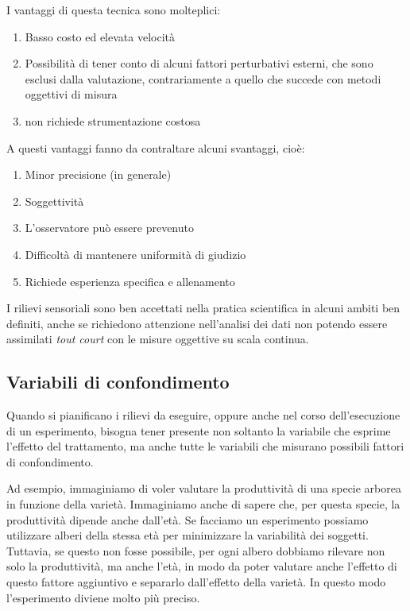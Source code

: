 \documentclass[a4paper,12pt,oneside]{book}
\providecommand{\tightlist}{%
  \setlength{\itemsep}{0pt}\setlength{\parskip}{0pt}}
\theoremstyle{definition}
\theoremstyle{definition}
\theoremstyle{definition}
\theoremstyle{remark}
\begin{document}
I vantaggi di questa tecnica sono molteplici:

\begin{enumerate}
\def\labelenumi{\arabic{enumi}.}
\tightlist
\item
  Basso costo ed elevata velocità
\item
  Possibilità di tener conto di alcuni fattori perturbativi esterni, che
  sono esclusi dalla valutazione, contrariamente a quello che succede
  con metodi oggettivi di misura
\item
  non richiede strumentazione costosa
\end{enumerate}

A questi vantaggi fanno da contraltare alcuni svantaggi, cioè:

\begin{enumerate}
\def\labelenumi{\arabic{enumi}.}
\tightlist
\item
  Minor precisione (in generale)
\item
  Soggettività
\item
  L'osservatore può essere prevenuto
\item
  Difficoltà di mantenere uniformità di giudizio
\item
  Richiede esperienza specifica e allenamento
\end{enumerate}

I rilievi sensoriali sono ben accettati nella pratica scientifica in
alcuni ambiti ben definiti, anche se richiedono attenzione nell'analisi
dei dati non potendo essere assimilati \emph{tout court} con le misure
oggettive su scala continua.

\subsection{Variabili di
confondimento}\label{variabili-di-confondimento}

Quando si pianificano i rilievi da eseguire, oppure anche nel corso
dell'esecuzione di un esperimento, bisogna tener presente non soltanto
la variabile che esprime l'effetto del trattamento, ma anche tutte le
variabili che misurano possibili fattori di confondimento.

Ad esempio, immaginiamo di voler valutare la produttività di una specie
arborea in funzione della varietà. Immaginiamo anche di sapere che, per
questa specie, la produttività dipende anche dall'età. Se facciamo un
esperimento possiamo utilizzare alberi della stessa età per minimizzare
la variabilità dei soggetti. Tuttavia, se questo non fosse possibile,
per ogni albero dobbiamo rilevare non solo la produttività, ma anche
l'età, in modo da poter valutare anche l'effetto di questo fattore
aggiuntivo e separarlo dall'effetto della varietà. In questo modo
l'esperimento diviene molto più preciso.
\end{document}
